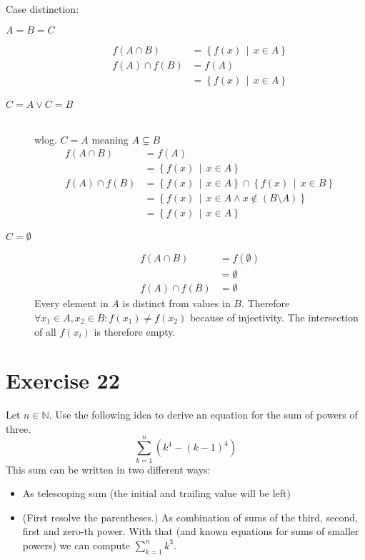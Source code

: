 \documentclass[a4paper]{article}
\theoremstyle{definition}
\newcommand\setdef[2]{\left\{#1\,\middle|\,#2\right\}}
\begin{document}
Case distinction:
\begin{description}
  \item[$A = B = C$]
    \begin{align*}
         f(A \cap B) &= \setdef{f(x)}{x \in A} \\
      f(A) \cap f(B) &= f(A) \\
                     &= \setdef{f(x)}{x \in A}
    \end{align*}
  \item[$C = A \dot\lor C = B$] \hfill{} \\
    wlog. $C = A$ meaning $A \subsetneq B$
    \begin{align*}
         f(A \cap B) &= f(A) \\
                     &= \setdef{f(x)}{x \in A} \\
      f(A) \cap f(B) &= \setdef{f(x)}{x \in A} \cap \setdef{f(x)}{x \in B} \\
                     &= \setdef{f(x)}{x \in A \land x \not\in (B \setminus A)} \\
                     &= \setdef{f(x)}{x \in A}
    \end{align*}
  \item[$C = \emptyset$]
    \begin{align*}
      f(A \cap B)    &= f(\emptyset) \\
                     &= \emptyset \\
      f(A) \cap f(B) &= \emptyset
    \end{align*}
    Every element in $A$ is distinct from values in $B$.
    Therefore $\forall x_1 \in A, x_2 \in B: f(x_1) \neq f(x_2)$ because of injectivity.
    The intersection of all $f(x_i)$ is therefore empty.
\end{description}

\section{Exercise 22}

\begin{ex}
  Let $n \in \mathbb{N}$. Use the following idea to derive an equation for the sum of powers of three.
  \[ \sum_{k=1}^n \left(k^4 - (k - 1)^4\right) \]
  This sum can be written in two different ways:
  \begin{itemize}
    \item As telescoping sum (the initial and trailing value will be left)
    \item (First resolve the parentheses.)
      As combination of sums of the third, second, first and zero-th power.
      With that (and known equations for sums of smaller powers)
      we can compute $\sum_{k=1}^n k^3$.
  \end{itemize}
\end{ex}
\end{document}
